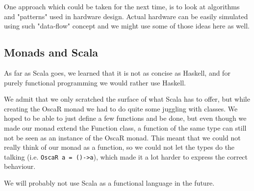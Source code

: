 \documentclass[a4paper]{article}
\begin{document}
One approach which could
be taken for the next time, is to look at algorithms and "patterns" used in hardware
design. Actual hardware can be easily simulated using such "data-flow" concept
and we might use some of those ideas here as well.


\subsection{Monads and Scala}
As far as Scala goes, 
we learned that it is not as concise as Haskell,
and for purely functional programming we would rather use Haskell.

We admit that we only scratched the surface of what Scala has to offer,
but while creating the OscaR monad we had to do quite some juggling with classes.
We hoped to be able to just define a few functions and be done, 
but even though we made our monad extend the Function class,
a function of the same type can still not be seen as an instance of the OscaR monad.
This meant that we could not really think of our monad as a function,
so we could not let the types do the talking (i.e. \verb|OscaR a = ()->a|),
which made it a lot harder to express the correct behaviour.

We will probably not use Scala as a functional language in the future.

\printbibliography
\end{document}
